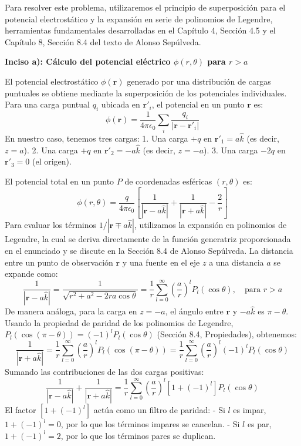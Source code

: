 \documentclass[a4paper]{article}
\begin{document}
Para resolver este problema, utilizaremos el principio de superposición para el potencial electrostático y la expansión en serie de polinomios de Legendre, herramientas fundamentales desarrolladas en el Capítulo 4, Sección 4.5 y el Capítulo 8, Sección 8.4 del texto de Alonso Sepúlveda.

\textbf{Inciso a): Cálculo del potencial eléctrico $\phi(r, \theta)$ para $r > a$}

El potencial electrostático $\phi(\mathbf{r})$ generado por una distribución de cargas puntuales se obtiene mediante la superposición de los potenciales individuales. Para una carga puntual $q_i$ ubicada en $\mathbf{r}'_i$, el potencial en un punto $\mathbf{r}$ es:
$$
\phi(\mathbf{r}) = \frac{1}{4\pi\epsilon_0} \sum_i \frac{q_i}{|\mathbf{r} - \mathbf{r}'_i|}
$$
En nuestro caso, tenemos tres cargas:
1. Una carga $+q$ en $\mathbf{r}'_1 = a\hat{k}$ (es decir, $z = a$).
2. Una carga $+q$ en $\mathbf{r}'_2 = -a\hat{k}$ (es decir, $z = -a$).
3. Una carga $-2q$ en $\mathbf{r}'_3 = 0$ (el origen).

El potencial total en un punto $P$ de coordenadas esféricas $(r, \theta)$ es:
$$
\phi(r, \theta) = \frac{q}{4\pi\epsilon_0} \left[ \frac{1}{|\mathbf{r} - a\hat{k}|} + \frac{1}{|\mathbf{r} + a\hat{k}|} - \frac{2}{r} \right]
$$
Para evaluar los términos $1/|\mathbf{r} \mp a\hat{k}|$, utilizamos la expansión en polinomios de Legendre, la cual se deriva directamente de la función generatriz proporcionada en el enunciado y se discute en la Sección 8.4 de Alonso Sepúlveda. La distancia entre un punto de observación $\mathbf{r}$ y una fuente en el eje $z$ a una distancia $a$ se expande como:
$$
\frac{1}{|\mathbf{r} - a\hat{k}|} = \frac{1}{\sqrt{r^2 + a^2 - 2ra\cos\theta}} = \frac{1}{r} \sum_{l=0}^{\infty} \left(\frac{a}{r}\right)^l P_l(\cos\theta), \quad \text{para } r > a
$$
De manera análoga, para la carga en $z = -a$, el ángulo entre $\mathbf{r}$ y $-a\hat{k}$ es $\pi - \theta$. Usando la propiedad de paridad de los polinomios de Legendre, $P_l(\cos(\pi - \theta)) = (-1)^l P_l(\cos\theta)$ (Sección 8.4, Propiedades), obtenemos:
$$
\frac{1}{|\mathbf{r} + a\hat{k}|} = \frac{1}{r} \sum_{l=0}^{\infty} \left(\frac{a}{r}\right)^l P_l(\cos(\pi - \theta)) = \frac{1}{r} \sum_{l=0}^{\infty} \left(\frac{a}{r}\right)^l (-1)^l P_l(\cos\theta)
$$
Sumando las contribuciones de las dos cargas positivas:
$$
\frac{1}{|\mathbf{r} - a\hat{k}|} + \frac{1}{|\mathbf{r} + a\hat{k}|} = \frac{1}{r} \sum_{l=0}^{\infty} \left(\frac{a}{r}\right)^l \left[ 1 + (-1)^l \right] P_l(\cos\theta)
$$
El factor $\left[ 1 + (-1)^l \right]$ actúa como un filtro de paridad:
- Si $l$ es impar, $1 + (-1)^l = 0$, por lo que los términos impares se cancelan.
- Si $l$ es par, $1 + (-1)^l = 2$, por lo que los términos pares se duplican.
\end{document}
